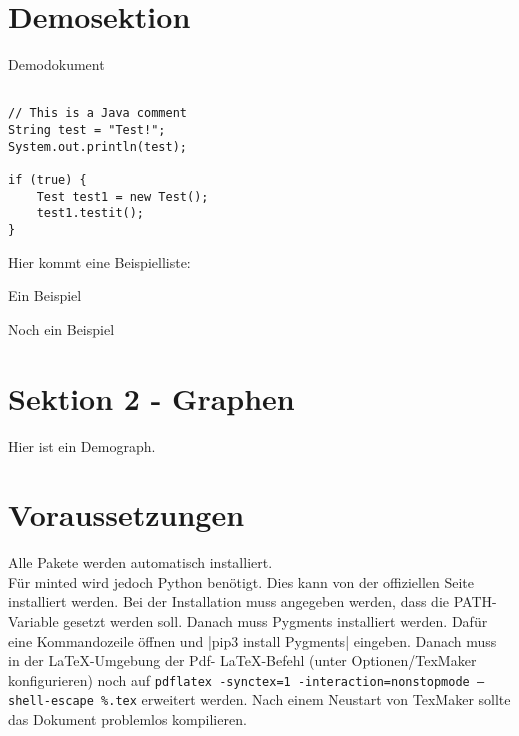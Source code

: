 \documentclass[a4paper,10pt]{article}
\begin{document}
\section*{Demosektion}
Demodokument

\begin{verbatim}

// This is a Java comment
String test = "Test!";
System.out.println(test);

if (true) {
	Test test1 = new Test();
	test1.testit();
}
\end{verbatim}

Hier kommt eine Beispielliste:

\begin{arrowlist}
\item Ein Beispiel
\item Noch ein Beispiel
\end{arrowlist}

\section*{Sektion 2 - Graphen}
Hier ist ein Demograph.


\section*{Voraussetzungen}
Alle Pakete werden automatisch installiert.\\
Für minted wird jedoch Python benötigt. Dies kann von der offiziellen Seite installiert werden. Bei der Installation muss angegeben werden, dass die PATH-Variable gesetzt werden soll. Danach muss Pygments installiert werden. Dafür eine Kommandozeile öffnen und 
|pip3 install Pygments|
eingeben. Danach muss in der \LaTeX -Umgebung der Pdf- \LaTeX -Befehl (unter Optionen/TexMaker konfigurieren) noch auf \texttt{pdflatex -synctex=1 -interaction=nonstopmode --shell-escape \%.tex} erweitert werden.
Nach einem Neustart von TexMaker sollte das Dokument problemlos kompilieren.
\end{document}
